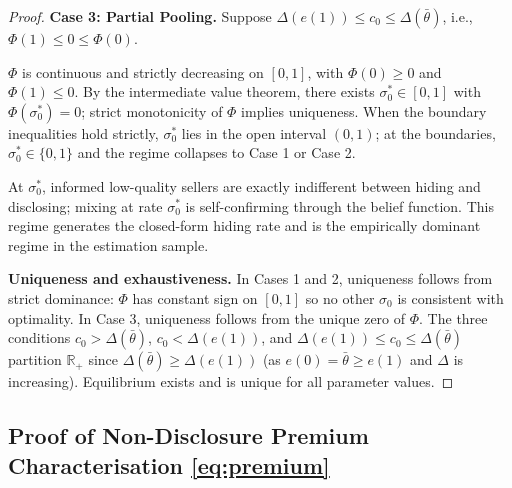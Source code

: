 \documentclass[10pt,letterpaper]{bp-template-concise}
\begin{document}
\begin{proof}
\medskip
\textbf{Case 3: Partial Pooling.} Suppose $\Delta(e(1)) \leq c_0 \leq \Delta(\bar{\theta})$, i.e., $\Phi(1) \leq 0 \leq \Phi(0)$.

$\Phi$ is continuous and strictly decreasing on $[0,1]$, with $\Phi(0) \geq 0$ and $\Phi(1) \leq 0$. By the intermediate value theorem, there exists $\sigma_0^* \in [0,1]$ with $\Phi(\sigma_0^*) = 0$; strict monotonicity of $\Phi$ implies uniqueness. When the boundary inequalities hold strictly, $\sigma_0^*$ lies in the open interval $(0,1)$; at the boundaries, $\sigma_0^* \in \{0,1\}$ and the regime collapses to Case 1 or Case 2.

At $\sigma_0^*$, informed low-quality sellers are exactly indifferent between hiding and disclosing; mixing at rate $\sigma_0^*$ is self-confirming through the belief function. This regime generates the closed-form hiding rate and is the empirically dominant regime in the estimation sample.

\medskip
\textbf{Uniqueness and exhaustiveness.} In Cases 1 and 2, uniqueness follows from strict dominance: $\Phi$ has constant sign on $[0,1]$ so no other $\sigma_0$ is consistent with optimality. In Case 3, uniqueness follows from the unique zero of $\Phi$. The three conditions $c_0 > \Delta(\bar{\theta})$, $c_0 < \Delta(e(1))$, and $\Delta(e(1)) \leq c_0 \leq \Delta(\bar{\theta})$ partition $\mathbb{R}_{+}$ since $\Delta(\bar{\theta}) \geq \Delta(e(1))$ (as $e(0) = \bar{\theta} \geq e(1)$ and $\Delta$ is increasing). Equilibrium exists and is unique for all parameter values.
\end{proof}

\subsection*{Proof of Non-Disclosure Premium Characterisation \eqref{eq:premium}}
\end{document}

